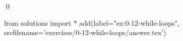
\begin{ex}
  \label{ex:0-12-while-loops}
  
  \qed
\end{ex}
\begin{python0}
from solutions import *
add(label="ex:0-12-while-loops",
    srcfilename='exercises/0-12-while-loops/answer.tex')
\end{python0}
